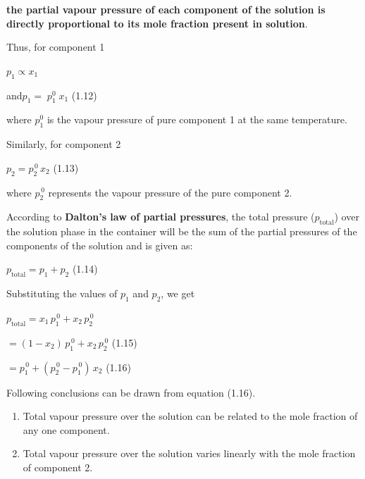 \documentclass[11pt,a4paper]{article}
\begin{document}
\noindent\hfill\begin{minipage}[t]{0.74\textwidth}
\textbf{the partial vapour pressure of each component of the solution is directly proportional to its mole fraction present in solution}.

\hspace*{1.5em}Thus, for component 1

\hspace*{6.5em}$p_1 \propto x_1$

\hspace*{3em}and\hspace{2.2em}$p_1 = \; p_1^0\; x_1$ \hfill (1.12)

\hspace*{1.5em}where $p_1^0$ is the vapour pressure of pure component 1 at the same temperature.

\hspace*{1.5em}Similarly, for component 2

\hspace*{6.5em}$p_2 = p_2^{\,0}\, x_2$ \hfill (1.13)

\hspace*{1.5em}where $p_2^{\,0}$ represents the vapour pressure of the pure component 2.

\hspace*{1.5em}According to \textbf{Dalton's law of partial pressures}, the total pressure ($p_{\text{total}}$) over the solution phase in the container will be the sum of the partial pressures of the components of the solution and is given as:

\hspace*{3em}$p_{\text{total}} = p_1 + p_2$ \hfill (1.14)

\hspace*{1.5em}Substituting the values of $p_1$ and $p_2$, we get

\hspace*{3em}$p_{\text{total}} = x_1\, p_1^{\,0} + x_2\, p_2^{\,0}$

\hspace*{6.6em}$= (1 - x_2)\, p_1^{\,0} + x_2\, p_2^{\,0}$ \hfill (1.15)

\hspace*{6.6em}$= p_1^{\,0} + (p_2^{\,0} - p_1^{\,0})\, x_2$ \hfill (1.16)

\hspace*{1.5em}Following conclusions can be drawn from equation (1.16).
\begin{enumerate}[label=(\roman*),leftmargin=24pt,itemsep=1pt,topsep=1pt]
\item Total vapour pressure over the solution can be related to the mole fraction of any one component.
\item Total vapour pressure over the solution varies linearly with the mole fraction of component 2.
\end{enumerate}
\end{minipage}
\end{document}
